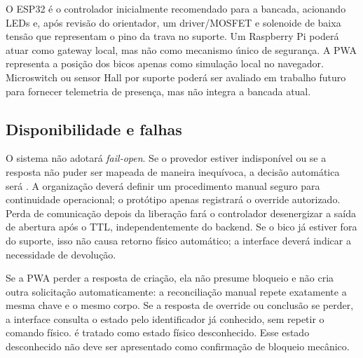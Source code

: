 O ESP32 é o controlador inicialmente recomendado para a bancada, acionando LEDs
e, após revisão do orientador, um driver/MOSFET e solenoide de baixa tensão que
representam o pino da trava no suporte. Um Raspberry Pi poderá atuar como
gateway local, mas não como mecanismo único de segurança. A PWA representa a
posição dos bicos apenas como simulação local no navegador. Microswitch ou
sensor Hall por suporte poderá ser avaliado em trabalho futuro para fornecer
telemetria de presença, mas não integra a bancada atual.

\subsection{Disponibilidade e falhas}

O sistema não adotará \textit{fail-open}. Se o provedor estiver indisponível ou
se a resposta não puder ser mapeada de maneira inequívoca, a decisão automática
será . A organização deverá definir um procedimento
manual seguro para continuidade operacional; o protótipo apenas registrará o
override autorizado. Perda de comunicação depois da liberação fará o
controlador desenergizar a saída de abertura após o TTL, independentemente do
backend. Se o bico já estiver fora do suporte, isso não causa retorno físico
automático; a interface deverá indicar a necessidade de devolução.

Se a PWA perder a resposta de criação, ela não presume bloqueio e não cria outra
solicitação automaticamente: a reconciliação manual repete exatamente a mesma
chave e o mesmo corpo. Se a resposta de override ou conclusão se perder, a
interface consulta o estado pelo identificador já conhecido, sem repetir o
comando físico.  é tratado como estado físico desconhecido.
Esse estado desconhecido não deve ser apresentado como confirmação de bloqueio
mecânico.
